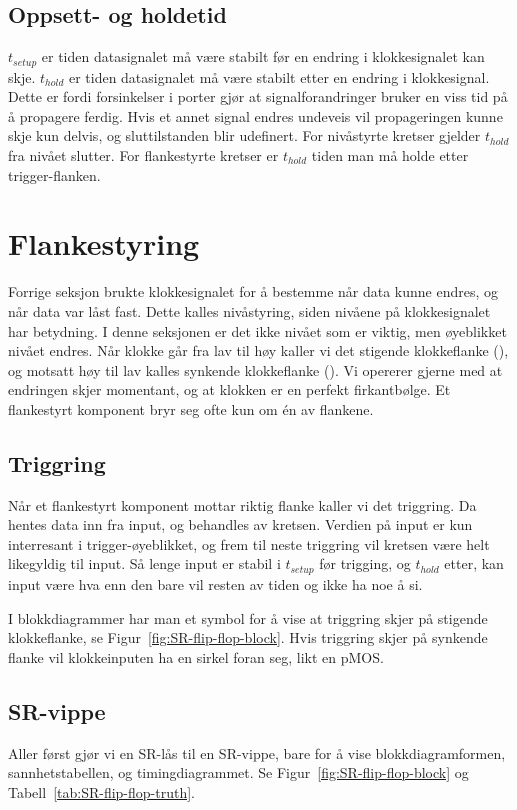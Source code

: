 \documentclass[12pt,a4paper,norsk]{article}
\newcommand{\rising}{\texttiming{[-,timing/slope=0]LH}}
\newcommand{\falling}{\texttiming{[-,timing/slope=0]HL}}
\begin{document}
\subsection{Oppsett- og holdetid}
$t_{setup}$ er tiden datasignalet må være stabilt før en endring i
klokkesignalet kan skje. $t_{hold}$ er tiden datasignalet må være stabilt etter
en endring i klokkesignal. Dette er fordi forsinkelser i porter gjør at
signalforandringer bruker en viss tid på å propagere ferdig. Hvis et annet
signal endres undeveis vil propageringen kunne skje kun delvis, og sluttilstanden
blir udefinert. For nivåstyrte kretser gjelder $t_{hold}$ fra nivået slutter.
For flankestyrte kretser er $t_{hold}$ tiden man må holde etter trigger-flanken.

\section{Flankestyring}
Forrige seksjon brukte klokkesignalet for å bestemme når data kunne endres, og
når data var låst fast. Dette kalles nivåstyring, siden nivåene på
klokkesignalet har betydning. I denne seksjonen er det ikke nivået som er
viktig, men øyeblikket nivået endres. Når klokke går fra lav til høy kaller vi
det stigende klokkeflanke (\rising), og motsatt høy til lav kalles synkende
klokkeflanke (\falling).
Vi opererer gjerne med at endringen skjer momentant, og at klokken er en perfekt
firkantbølge. Et flankestyrt komponent bryr seg ofte kun om én av flankene.

\subsection{Triggring}
Når et flankestyrt komponent mottar riktig flanke kaller vi det triggring. Da
hentes data inn fra input, og behandles av kretsen. Verdien på input er kun interresant i
trigger-øyeblikket, og frem til neste triggring vil kretsen være helt likegyldig
til input. Så lenge input er stabil i $t_{setup}$ før trigging, og $t_{hold}$
etter, kan input være hva enn den bare vil resten av tiden og ikke ha
noe å si.

I blokkdiagrammer har man et symbol for å vise at triggring skjer på stigende
klokkeflanke, se Figur~\ref{fig:SR-flip-flop-block}. Hvis triggring skjer på synkende
flanke vil klokkeinputen ha en sirkel foran seg, likt en pMOS\@.

\subsection{SR-vippe}
Aller først gjør vi en SR-lås til en SR-vippe, bare for å vise blokkdiagramformen,
sannhetstabellen, og timingdiagrammet. Se Figur~\ref{fig:SR-flip-flop-block} og Tabell~\ref{tab:SR-flip-flop-truth}.
\end{document}
